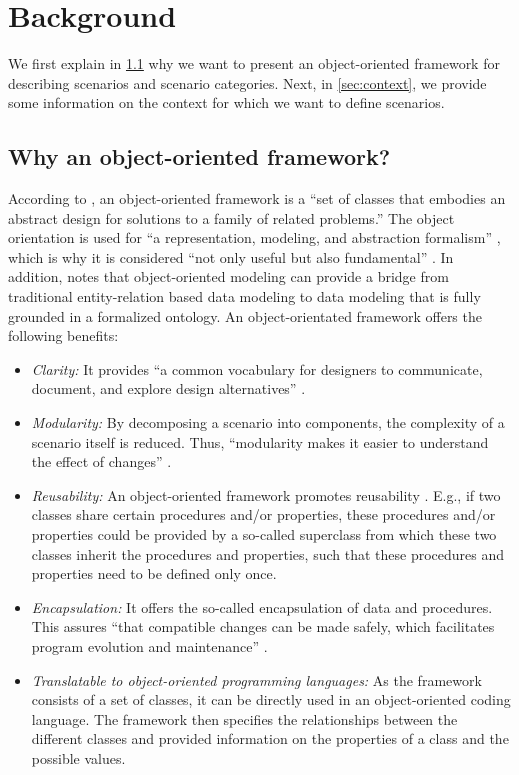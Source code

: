 \section{Background}
\label{sec:background}

We first explain in \cref{sec:why oo framework} why we want to present an \cstartc object-oriented framework \cendc for describing scenarios and  scenario categories. Next, in \cref{sec:context}, we provide some information on the context for which we want to define scenarios. 


\cstartb
\subsection{Why an  object-oriented framework?}
\label{sec:why oo framework}

According to \textcite{johnson1988designing}, an object-oriented framework is a ``set of classes that embodies an abstract design for solutions to a family of related problems.''
The object orientation is used for ``a representation, modeling, and abstraction formalism'' \autocite{wegner1990concepts}, which is why it is considered ``not only useful but also fundamental'' \autocite{wegner1990concepts}. \cendb
\cstartd In addition, \textcite{patridge2005business} notes that object-oriented modeling can provide a bridge from traditional entity-relation based data modeling to data modeling that is fully grounded in a formalized ontology. \cendd
\cstartb An object-orientated framework offers the following benefits:
\begin{itemize}
	\item \cendb\cstartc\emph{Clarity:} \cendc\cstartb It provides ``a common vocabulary for designers to communicate, document, and explore design alternatives'' \autocite{gamma1993design}.
	\item \cendb\cstartc\emph{Modularity:} By decomposing a scenario into components, the complexity of a scenario itself is reduced. Thus, ``modularity makes it easier to understand the effect of changes'' \cite{johnson1988designing}.
	\item \emph{Reusability:} \cendc\cstartb An object-oriented framework promotes reusability \autocite{snyder1986encapsulation, meyer1987reusability, johnson1988designing}. E.g., if two classes share certain procedures and/or properties, these procedures and/or properties could be provided by a so-called superclass from which these two classes inherit the procedures and properties, such that these procedures and properties need to be defined only once.
	\item \cendb\cstartc\emph{Encapsulation:} \cendc\cstartb It offers the so-called encapsulation of data and procedures. This assures ``that compatible changes can be made safely, which facilitates program evolution and maintenance'' \autocite{snyder1986encapsulation}.
	\item \cendb\cstartc\emph{Translatable to object-oriented programming languages:} \cendc\cstartb As the framework consists of a set of classes, it can be directly used in an object-oriented coding language. The framework then specifies the relationships between the different classes and provided information on the properties of a class and the possible values.
\end{itemize}
